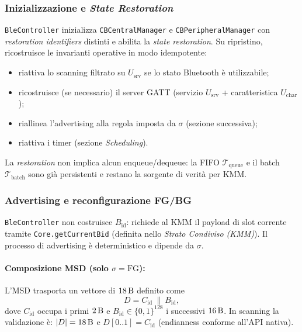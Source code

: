 \documentclass[a4paper,11pt,table,dvipsnames]{article}
\begin{document}
\subsubsection{Inizializzazione e \emph{State Restoration}}
\texttt{BleController} inizializza \texttt{CBCentralManager} e \texttt{CBPeripheralManager} con \emph{restoration identifiers} distinti e abilita la \emph{state restoration}. Su ripristino, ricostruisce le invarianti operative in modo idempotente:
\begin{itemize}[nosep]
    \item riattiva lo scanning filtrato su \(U_{\text{srv}}\) se lo stato Bluetooth è utilizzabile;
    \item ricostruisce (se necessario) il server GATT (servizio \(U_{\text{srv}}\) + caratteristica \(U_{\text{char}}\));
    \item riallinea l’advertising alla regola imposta da \(\sigma\) (sezione successiva);
    \item riattiva i timer (sezione \emph{Scheduling}).
\end{itemize}
La \emph{restoration} non implica alcun enqueue/dequeue: la FIFO \(\mathcal{T}_{\text{queue}}\) e il batch \(\mathcal{T}_{\text{batch}}\) sono già persistenti e restano la sorgente di verità per KMM.

\subsubsection{Advertising e reconfigurazione FG/BG}
\texttt{BleController} non costruisce \(B_{\text{id}}\): richiede al KMM il payload di slot corrente tramite \texttt{Core.getCurrentBid} (definita nello \emph{Strato Condiviso (KMM)}). Il processo di advertising è deterministico e dipende da \(\sigma\).

\paragraph{Composizione MSD (solo \(\sigma=\mathrm{FG}\)):}
L’MSD trasporta un vettore di \(\SI{18}{\byte}\) definito come
\[
    D = C_{\text{id}} \ \| \ B_{\text{id}},
\]
dove \(C_{\text{id}}\) occupa i primi \(\SI{2}{\byte}\) e \(B_{\text{id}}\in\{0,1\}^{128}\) i successivi \(\SI{16}{\byte}\). In scanning la validazione è: \(|D|=\SI{18}{\byte}\) e \(D[0..1]=C_{\text{id}}\) (endianness conforme all’API nativa).
\end{document}

